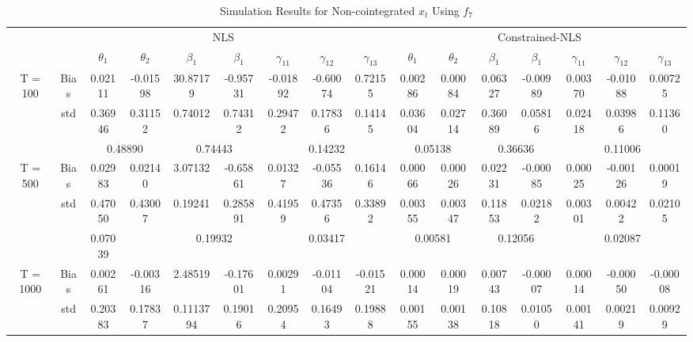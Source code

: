 \documentclass[a4paper,12pt,times,numbered,print,index]{report}
\numberwithin{equation}{section}
\begin{document}
\begin{table}[htbp]
	\centering
	\caption{Simulation Results for Non-cointegrated $x_t$ Using $f_7$}
	\begin{adjustbox}{max width=\textwidth}
	\begin{tabular}{cccccccccccccccc}
		\toprule
		& \multicolumn{8}{c}{NLS}                                       & \multicolumn{7}{c}{Constrained-NLS} \\
		&       & $\theta_1$ & $\theta_2$ & $\beta_1$  & $\beta_1$  & $\gamma_{11}$ & $\gamma_{12}$ & $\gamma_{13}$ & $\theta_1$ & $\theta_2$ & $\beta_1$  & $\beta_1$  & $\gamma_{11}$ & $\gamma_{12}$ & $\gamma_{13}$ \\
		\midrule
		\multirow{3}[1]{*}{T = 100} & Bias  & \textcolor[rgb]{ 0,  .439,  .753}{0.02111} & -0.01598 & 30.87179 & -0.95731 & -0.01892 & -0.60074 & 0.72155 & \textcolor[rgb]{ 0,  .439,  .753}{0.00286} & 0.00084 & 0.06327 & -0.00989 & 0.00370 & -0.01088 & 0.00725 \\
		& std   & 0.36946 & 0.31152 & 0.74012 & 0.74312 & 0.29472 & 0.17836 & 0.14145 & 0.03604 & 0.02714 & 0.36089 & 0.05816 & 0.02418 & 0.03986 & 0.11360 \\
		&       & \multicolumn{2}{c}{0.48890} & \multicolumn{2}{c}{0.74443} & \multicolumn{3}{c}{0.14232} & \multicolumn{2}{c}{0.05138} & \multicolumn{2}{c}{0.36636} & \multicolumn{3}{c}{0.11006} \\
		\multirow{3}[0]{*}{T = 500} & Bias  & \textcolor[rgb]{ 0,  .439,  .753}{0.02983} & 0.02140 & 3.07132 & -0.65861 & 0.01327 & -0.05536 & 0.16146 & \textcolor[rgb]{ 0,  .439,  .753}{0.00066} & 0.00026 & 0.02231 & -0.00085 & 0.00025 & -0.00126 & 0.00019 \\
		& std   & 0.47050 & 0.43007 & 0.19241 & 0.285891 & 0.41959 & 0.47356 & 0.33892 & 0.00355 & 0.00347 & 0.11853 & 0.02182 & 0.00301 & 0.00422 & 0.02105 \\
		&       & 0.07039 &       & \multicolumn{2}{c}{0.19932} & \multicolumn{3}{c}{0.03417} & \multicolumn{2}{c}{0.00581} & \multicolumn{2}{c}{0.12056} & \multicolumn{3}{c}{0.02087} \\
		\multirow{3}[1]{*}{T = 1000} & Bias  & \textcolor[rgb]{ 0,  .439,  .753}{0.00261} & -0.00316 & 2.48519 & -0.17601 & 0.00291 & -0.01104 & -0.01521 & \textcolor[rgb]{ 0,  .439,  .753}{0.00014} & 0.00019 & 0.00743 & -0.00007 & 0.00014 & -0.00050 & -0.00008 \\
		& std   & 0.20383 & 0.17837 & 0.1113794 & 0.19016 & 0.20954 & 0.16493 & 0.19888 & 0.00155 & 0.00138 & 0.10818 & 0.01050 & 0.00141 & 0.00219 & 0.00929 \\

\end{tabular}
\end{adjustbox}
\end{table}
\end{document}
